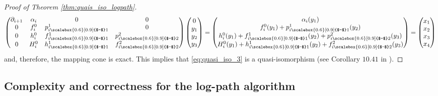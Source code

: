 \documentclass[a4paper,UKenglish,cleveref,nolineno,autoref]{socg-lipics-v2021}
\newcommand{\minus}{\mathbin{\scalebox{0.6}[0.9]{$-$}}}
\begin{document}
\begin{proof}[Proof of Theorem \ref{thm:quais_iso_logpath}]
\begin{equation*}
\begin{pmatrix} \partial_{i+1} & \alpha_{i} & 0 & 0 \\ 0 & f^0_{i} & p_{i\minus 1}^1 & 0 \\ 0 & h_{i}^0 & f_{i\minus 1}^1 & p_{i\minus 2}^2 \\ 0 & H_{i}^0 & h_{i\minus 1}^1 & f_{i\minus 2}^2 \end{pmatrix}\begin{pmatrix}0\\y_1\\y_2\\y_3\end{pmatrix}=\begin{pmatrix}\alpha_i(y_1)\\f_i^0(y_1)+p_{i\minus 1}^1(y_2)\\h_{i}^0(y_1)+f_{i\minus 1}^1(y_2)+p_{i\minus 2}^2(y_3)\\H_i^0(y_1)+h_{i\minus 1}^1(y_2)+f_{i\minus 2}^2(y_3)\end{pmatrix}=\begin{pmatrix}x_1\\x_2\\x_3\\x_4\end{pmatrix}
\end{equation*}
and, therefore, the mapping cone is exact. This implies that \eqref{eq:quasi_iso_3} is a quasi-isomorphism (see Corollary $10.41$ in \cite{rotman}).
\end{proof}




\subsection{Complexity and correctness for the log-path algorithm} \label{app:log_path_algo}

\logpathalgo*
\end{document}
